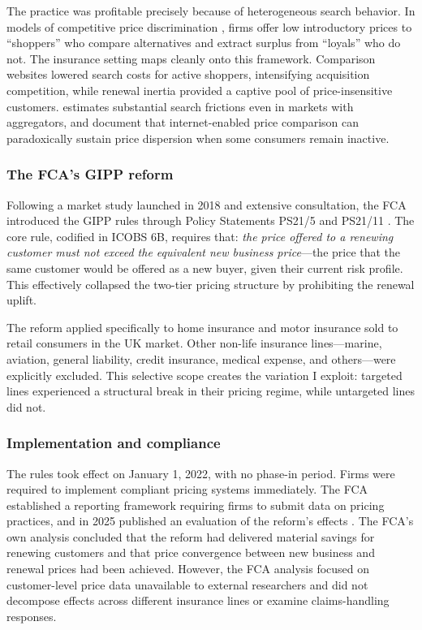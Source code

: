 \documentclass[12pt]{article}
\begin{document}
The practice was profitable precisely because of heterogeneous search behavior. In models of competitive price discrimination \citep{ArmstrongVickers2001, Stole2007}, firms offer low introductory prices to ``shoppers'' who compare alternatives and extract surplus from ``loyals'' who do not. The insurance setting maps cleanly onto this framework. Comparison websites lowered search costs for active shoppers, intensifying acquisition competition, while renewal inertia provided a captive pool of price-insensitive customers. \citet{Honka2014} estimates substantial search frictions even in markets with aggregators, and \citet{BrownGoolsbee2002} document that internet-enabled price comparison can paradoxically sustain price dispersion when some consumers remain inactive.

\subsubsection*{The FCA's GIPP reform} Following a market study launched in 2018 \citep{FCA_MS18} and extensive consultation, the FCA introduced the GIPP rules through Policy Statements PS21/5 and PS21/11 \citep{FCA_PS21_5, FCA_PS21_11}. The core rule, codified in ICOBS 6B, requires that: \textit{the price offered to a renewing customer must not exceed the equivalent new business price}---the price that the same customer would be offered as a new buyer, given their current risk profile. This effectively collapsed the two-tier pricing structure by prohibiting the renewal uplift.

The reform applied specifically to home insurance and motor insurance sold to retail consumers in the UK market. Other non-life insurance lines---marine, aviation, general liability, credit insurance, medical expense, and others---were explicitly excluded. This selective scope creates the variation I exploit: targeted lines experienced a structural break in their pricing regime, while untargeted lines did not.

\subsubsection*{Implementation and compliance} The rules took effect on January 1, 2022, with no phase-in period. Firms were required to implement compliant pricing systems immediately. The FCA established a reporting framework requiring firms to submit data on pricing practices, and in 2025 published an evaluation of the reform's effects \citep{FCA_EP25_2}. The FCA's own analysis concluded that the reform had delivered material savings for renewing customers and that price convergence between new business and renewal prices had been achieved. However, the FCA analysis focused on customer-level price data unavailable to external researchers and did not decompose effects across different insurance lines or examine claims-handling responses.
\end{document}
